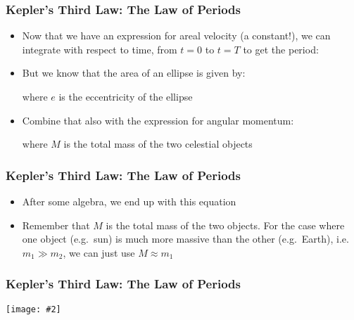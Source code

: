\documentclass[12pt,compress,aspectratio=169]{beamer}
\newcommand{\pic}[2]{\texttt{[image: \#2]}}
\begin{document}
\begin{frame}
  \frametitle{Kepler's Third Law: The Law of Periods}
  \begin{itemize}
  \item Now that we have an expression for areal velocity (a constant!), we can
    integrate with respect to time, from $t=0$ to $t=T$ to get the period:

  \item But we know that the area of an ellipse is given by:

    where $e$ is the eccentricity of the ellipse
  \item Combine that also with the expression for angular momentum:

    where $M$ is the total mass of the two celestial objects

  \end{itemize}
\end{frame}


\begin{frame}
  \frametitle{Kepler's Third Law: The Law of Periods}
  \begin{itemize}
  \item After some algebra, we end up with this equation


  \item Remember that $M$ is the total mass of the two objects. For the case
    where one object (e.g.\ sun) is much more massive than the other (e.g.\
    Earth), i.e.\ $m_1\gg m_2$, we can just use $M\approx m_1$

  \end{itemize}
\end{frame}



\begin{frame}
  \frametitle{Kepler's Third Law: The Law of Periods}
  \begin{center}
    \pic{.65}{kep8.png}
  \end{center}
\end{frame}
\end{document}
